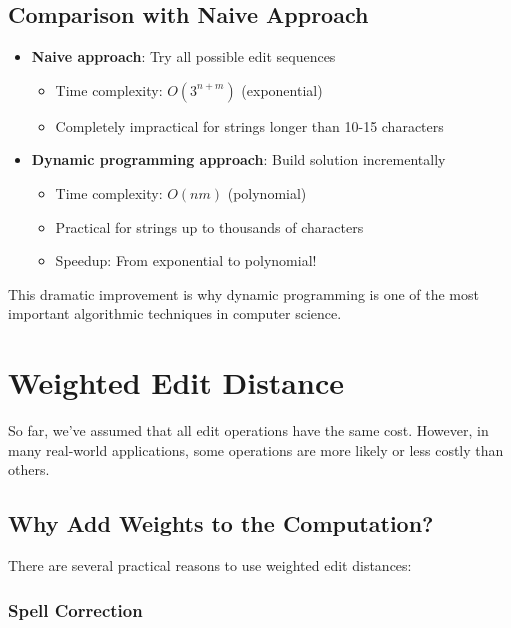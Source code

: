 \documentclass[11pt,a4paper]{article}
\theoremstyle{definition}
\theoremstyle{plain}
\theoremstyle{remark}
\begin{document}
\subsection{Comparison with Naive Approach}

\begin{itemize}
    \item \textbf{Naive approach}: Try all possible edit sequences
    \begin{itemize}
        \item Time complexity: $O(3^{n+m})$ (exponential)
        \item Completely impractical for strings longer than 10-15 characters
    \end{itemize}
    
    \item \textbf{Dynamic programming approach}: Build solution incrementally
    \begin{itemize}
        \item Time complexity: $O(nm)$ (polynomial)
        \item Practical for strings up to thousands of characters
        \item Speedup: From exponential to polynomial!
    \end{itemize}
\end{itemize}

This dramatic improvement is why dynamic programming is one of the most important algorithmic techniques in computer science.

\section{Weighted Edit Distance}

So far, we've assumed that all edit operations have the same cost. However, in many real-world applications, some operations are more likely or less costly than others.

\subsection{Why Add Weights to the Computation?}

There are several practical reasons to use weighted edit distances:

\subsubsection{Spell Correction}
\end{document}
